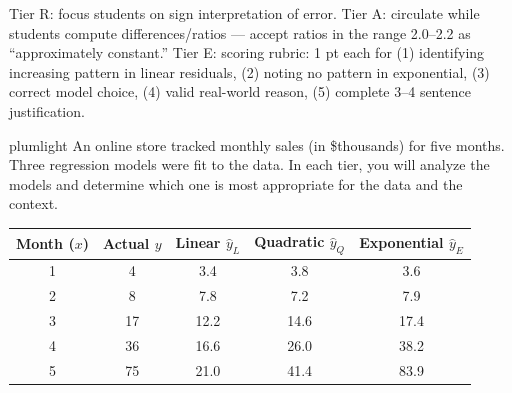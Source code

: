 \documentclass[10pt]{article}
\begin{document}
\namepartnerperiod

\vspace{0.1in}

\begin{teachernote}
Tier R: focus students on sign interpretation of error. Tier A: circulate while students
compute differences/ratios --- accept ratios in the range 2.0--2.2 as ``approximately constant.''
Tier E: scoring rubric: 1 pt each for (1) identifying increasing pattern in linear residuals,
(2) noting no pattern in exponential, (3) correct model choice, (4) valid real-world reason,
(5) complete 3--4 sentence justification.
\end{teachernote}

\begin{scenariobox}{plumlight}
\small
An online store tracked monthly sales (in \$thousands) for five months. Three regression
models were fit to the data. In each tier, you will analyze the models and determine which
one is most appropriate for the data and the context.

\medskip
\begin{center}
\renewcommand{\arraystretch}{1.4}
\begin{tabular}{c|c|c|c|c}
\textbf{Month ($x$)} & \textbf{Actual $y$} & \textbf{Linear $\hat{y}_L$} & \textbf{Quadratic $\hat{y}_Q$} & \textbf{Exponential $\hat{y}_E$} \\
\hline
1 &  4 & 3.4  & 3.8  & 3.6 \\
2 &  8 & 7.8  & 7.2  & 7.9 \\
3 & 17 & 12.2 & 14.6 & 17.4 \\
4 & 36 & 16.6 & 26.0 & 38.2 \\
5 & 75 & 21.0 & 41.4 & 83.9 \\
\end{tabular}
\end{center}
\end{scenariobox}

\vspace{0.1in}
\end{document}
